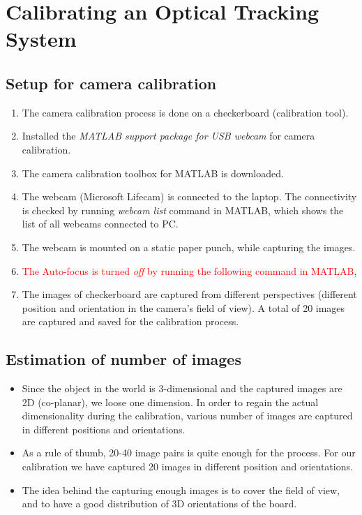 \documentclass[11pt,a4paper]{article}
\begin{document}
\newpage
\section{Calibrating an Optical Tracking System}
\subsection{Setup for camera calibration }
\begin{enumerate}
\item The camera calibration process is done on a checkerboard (calibration tool).
\item Installed the \textit{MATLAB support package for USB webcam} for camera calibration.
\item The camera calibration toolbox for MATLAB is downloaded.
\item The webcam (Microsoft Lifecam) is connected to the laptop. The connectivity is checked by running \textit{webcam list} command in MATLAB, which shows the list of all webcams connected to PC.
\item The webcam is mounted on a static paper punch, while capturing the images.
\item \textcolor{red}{The Auto-focus is turned \textit{off} by running the following command in MATLAB}, \\ 
\item The images of checkerboard are captured from different perspectives (different position and orientation in the camera's field of view). A total of 20 images are captured and saved for the calibration process.
\end{enumerate}

\subsection{Estimation of number of images}
\begin{itemize}
\item Since the object in the world is 3-dimensional and the captured images are 2D (co-planar), we loose one dimension. In order to regain the actual dimensionality during the calibration, various number of images are captured in different positions and orientations. 
\item As a rule of thumb, 20-40 image pairs is quite enough for the process. For our calibration we have captured 20 images in different position and orientations. 
\item The idea behind the capturing enough images is to cover the field of view, and to have a good distribution of 3D orientations of the board. 
\end{itemize}
\end{document}
